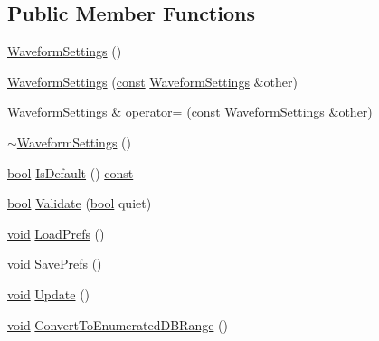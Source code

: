 \subsection*{Public Member Functions}
\begin{DoxyCompactItemize}
\item 
\hyperlink{class_waveform_settings_adfbc5fe93ebbb4c11d2958bf457d2c93}{Waveform\+Settings} ()
\item 
\hyperlink{class_waveform_settings_adf4db5f8b5f4e7c3c692e62d3ceb8677}{Waveform\+Settings} (\hyperlink{getopt1_8c_a2c212835823e3c54a8ab6d95c652660e}{const} \hyperlink{class_waveform_settings}{Waveform\+Settings} \&other)
\item 
\hyperlink{class_waveform_settings}{Waveform\+Settings} \& \hyperlink{class_waveform_settings_aabb3817ec97845f94ef1bb9523edffc4}{operator=} (\hyperlink{getopt1_8c_a2c212835823e3c54a8ab6d95c652660e}{const} \hyperlink{class_waveform_settings}{Waveform\+Settings} \&other)
\item 
\hyperlink{class_waveform_settings_aacd6c8d0197d2296ffccf04c6dd1413b}{$\sim$\+Waveform\+Settings} ()
\item 
\hyperlink{mac_2config_2i386_2lib-src_2libsoxr_2soxr-config_8h_abb452686968e48b67397da5f97445f5b}{bool} \hyperlink{class_waveform_settings_a4f806f0e9e566f5072982c2a1258b919}{Is\+Default} () \hyperlink{getopt1_8c_a2c212835823e3c54a8ab6d95c652660e}{const} 
\item 
\hyperlink{mac_2config_2i386_2lib-src_2libsoxr_2soxr-config_8h_abb452686968e48b67397da5f97445f5b}{bool} \hyperlink{class_waveform_settings_a5d3a653fbf573bedaa517d0b0d459f2d}{Validate} (\hyperlink{mac_2config_2i386_2lib-src_2libsoxr_2soxr-config_8h_abb452686968e48b67397da5f97445f5b}{bool} quiet)
\item 
\hyperlink{sound_8c_ae35f5844602719cf66324f4de2a658b3}{void} \hyperlink{class_waveform_settings_aa00fdad3eec1b5018daad91b796421e3}{Load\+Prefs} ()
\item 
\hyperlink{sound_8c_ae35f5844602719cf66324f4de2a658b3}{void} \hyperlink{class_waveform_settings_a5f70a2e8f8a3c8bd007b6d339e6b12df}{Save\+Prefs} ()
\item 
\hyperlink{sound_8c_ae35f5844602719cf66324f4de2a658b3}{void} \hyperlink{class_waveform_settings_a086e80ae01eadd6579b5a17cbdaec961}{Update} ()
\item 
\hyperlink{sound_8c_ae35f5844602719cf66324f4de2a658b3}{void} \hyperlink{class_waveform_settings_a72b855fab11cb78120b77b5146f31c4f}{Convert\+To\+Enumerated\+D\+B\+Range} ()
\item 

\end{DoxyCompactItemize}
